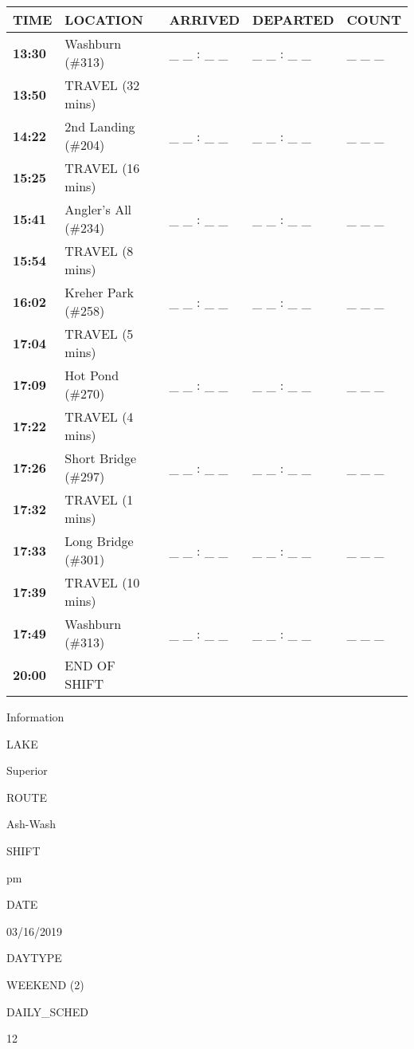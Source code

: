 \documentclass[]{article}
\begin{document}
\begin{tabular}{>{\bfseries}lllll}
\toprule
\textbf{TIME} & \textbf{LOCATION} & \textbf{ARRIVED} & \textbf{DEPARTED} & \textbf{COUNT}\\
\midrule
13:30 & Washburn (\#313) & \_ \_ : \_ \_ & \_ \_ : \_ \_ & \_ \_ \_\\
13:50 & TRAVEL (32 mins) &  &  & \\
14:22 & 2nd Landing (\#204) & \_ \_ : \_ \_ & \_ \_ : \_ \_ & \_ \_ \_\\
15:25 & TRAVEL (16 mins) &  &  & \\
15:41 & Angler's All (\#234) & \_ \_ : \_ \_ & \_ \_ : \_ \_ & \_ \_ \_\\
15:54 & TRAVEL (8 mins) &  &  & \\
16:02 & Kreher Park (\#258) & \_ \_ : \_ \_ & \_ \_ : \_ \_ & \_ \_ \_\\
17:04 & TRAVEL (5 mins) &  &  & \\
17:09 & Hot Pond (\#270) & \_ \_ : \_ \_ & \_ \_ : \_ \_ & \_ \_ \_\\
17:22 & TRAVEL (4 mins) &  &  & \\
17:26 & Short Bridge (\#297) & \_ \_ : \_ \_ & \_ \_ : \_ \_ & \_ \_ \_\\
17:32 & TRAVEL (1 mins) &  &  & \\
17:33 & Long Bridge (\#301) & \_ \_ : \_ \_ & \_ \_ : \_ \_ & \_ \_ \_\\
17:39 & TRAVEL (10 mins) &  &  & \\
17:49 & Washburn (\#313) & \_ \_ : \_ \_ & \_ \_ : \_ \_ & \_ \_ \_\\
20:00 & END OF SHIFT &  &  & \\
\bottomrule
\end{tabular}\newpage

Information

LAKE

Superior

ROUTE

Ash-Wash

SHIFT

pm

DATE

03/16/2019

DAYTYPE

WEEKEND (2)

DAILY\_SCHED

12

\vspace{24pt}
\end{document}
